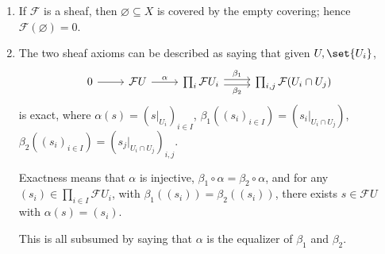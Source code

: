 \begin{enumerate}
	\item If $\mathcal{F}$ is a sheaf, then $\varnothing \subseteq X$ is covered
		by the empty covering; hence $\mathcal{F}(\varnothing) = 0$.
	\item The two sheaf axioms can be described as saying that given $U, \set{U_i}$,
		\[
			\begin{tikzcd}
				0\ar[r] & \mathcal{F}U\ar[r, "\alpha"] & \prod_i \mathcal{F}U_i \ar[r, shift left, "\beta_1"]\ar[r, shift right, "\beta_2" below] & \prod_{i, j} \mathcal{F}(U_i\cap U_j)
			\end{tikzcd}
			\]
			is exact, where $\alpha(s) = (s|_{U_i})_{i \in I}$, $\beta_1((s_i)_{i \in I}) = (s_i|_{U_i \cap U_j})$,
			$\beta_2((s_i)_{i \in I}) = (s_j|_{U_i\cap U_j})_{i, j}$.

			Exactness means that $\alpha$ is injective, $\beta_1\circ\alpha = \beta_2\circ\alpha$,
			and for any $(s_i) \in \prod_{i \in I}\mathcal{F}U_i$, with $\beta_1((s_i)) = \beta_2((s_i))$,
			there exists $s \in \mathcal{F}U$ with $\alpha(s) = (s_i)$.

			This is all subsumed by saying that $\alpha$ is the equalizer of $\beta_1$ and $\beta_2$.
\end{enumerate}
